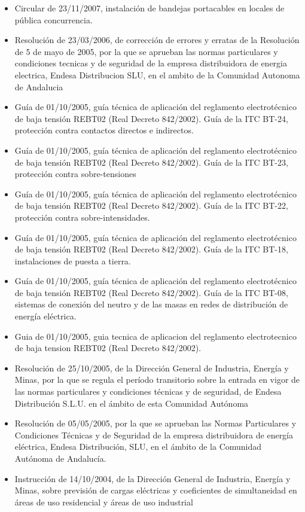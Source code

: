 \documentclass[../main.tex]{subfiles}
\begin{document}
\begin{itemize}
    \item Circular de 23/11/2007, instalación de bandejas portacables en locales de pública concurrencia.
    \item Resolución de 23/03/2006, de corrección de errores y erratas de la Resolución de 5 de mayo de 2005, por la que se aprueban las normas particulares y condiciones tecnicas y de seguridad de la empresa distribuidora de energia electrica, Endesa Distribucion SLU, en el ambito de la Comunidad Autonoma de Andalucia
    \item Guía de 01/10/2005, guía técnica de aplicación del reglamento electrotécnico de baja tensión REBT02 (Real Decreto 842/2002). Guía de la ITC BT-24, protección contra contactos directos e indirectos.
    \item Guía de 01/10/2005, guía técnica de aplicación del reglamento electrotécnico de baja tensión REBT02 (Real Decreto 842/2002). Guía de la ITC BT-23, protección contra sobre-tensiones
    \item Guía de 01/10/2005, guía técnica de aplicación del reglamento electrotécnico de baja tensión REBT02 (Real Decreto 842/2002). Guía de la ITC BT-22, protección contra sobre-intensidades.
    \item Guía de 01/10/2005, guía técnica de aplicación del reglamento electrotécnico de baja tensión REBT02 (Real Decreto 842/2002). Guía de la ITC BT-18, instalaciones de puesta a tierra.
    \item Guía de 01/10/2005, guía técnica de aplicación del reglamento electrotécnico de baja tensión REBT02 (Real Decreto 842/2002). Guía de la ITC BT-08, sistemas de conexión del neutro y de las masas en redes de distribución de energía eléctrica.
    \item Guia de 01/10/2005, guia tecnica de aplicacion del reglamento electrotecnico de baja tension REBT02 (Real Decreto 842/2002).
    \item Resolución de 25/10/2005, de la Dirección General de Industria, Energía y Minas, por la que se regula el período transitorio sobre la entrada en vigor de las normas particulares y condiciones técnicas y de seguridad, de Endesa Distribución S.L.U. en el ámbito de esta Comunidad Autónoma
    \item Resolución de 05/05/2005, por la que se aprueban las Normas Particulares y Condiciones Técnicas y de Seguridad de la empresa distribuidora de energía eléctrica, Endesa Distribución, SLU, en el ámbito de la Comunidad Autónoma de Andalucía.
    \item Instrucción de 14/10/2004, de la Dirección General de Industria, Energía y Minas, sobre previsión de cargas eléctricas y coeficientes de simultaneidad en áreas de uso residencial y áreas de uso industrial

\end{itemize}
\end{document}
